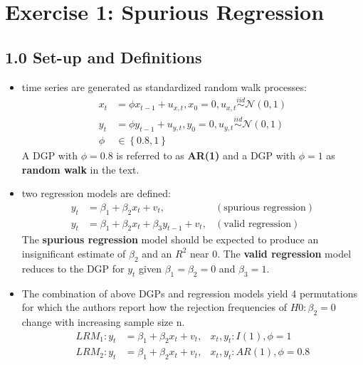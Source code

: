 \documentclass[]{article}
\title{}
\author{}
\begin{document}
\maketitle

\begin{abstract}

\end{abstract}

\section*{Exercise 1: Spurious Regression}
\subsection*{1.0 Set-up and Definitions}
\begin{itemize} 
	\item time series are generated as standardized random walk processes:
		\begin{align*}
			x_t &= \phi x_{t-1} + u_{x,t}, x_0=0, u_{x,t}  \overset{iid}{\sim}\mathcal{N}(0,1)\\
			y_t &= \phi y_{t-1} + u_{y,t}, y_0=0, u_{y,t}  \overset{iid}{\sim}\mathcal{N}(0,1)\\
			\phi &\in \left\{0.8, 1\right\}
		\end{align*}
		A DGP with $\phi=0.8$ is referred to as \textbf{AR(1)} and a DGP with $\phi=1$ as \textbf{random walk} in the text.
	\item two regression models are defined:
		\begin{align*}
			y_t &= \beta_1 +\beta_2 x_t + v_t, &(\text{spurious regression})\\
			y_t &= \beta_1 + \beta_2 x_t + \beta_3 y_{t-1} + v_t, &(\text{valid regression})
		\end{align*}
		The \textbf{spurious regression} model should be expected to produce an insignificant estimate of $\beta_2$ and an $R^2$ near 0.
		The \textbf{valid regression} model reduces to the DGP for $y_t$ given $\beta_1=\beta_2=0$ and $\beta_3=1$.
	\item The combination of above DGPs and regression models yield 4 permutations for which the authors report how the rejection frequencies of $H0: \beta_2=0$ change with increasing sample size n.
	\begin{align*}
		LRM_1: y_{t} &= \beta_{1} +\beta_{2}x_{t} + v_{t}, &x_t, y_t: I(1), \phi=1\\
		LRM_2: y_{t} &= \beta_{1} +\beta_{2}x_{t} + v_{t}, &x_t, y_t: AR(1), \phi=0.8\\

\end{align*}
\end{itemize}
\end{document}
